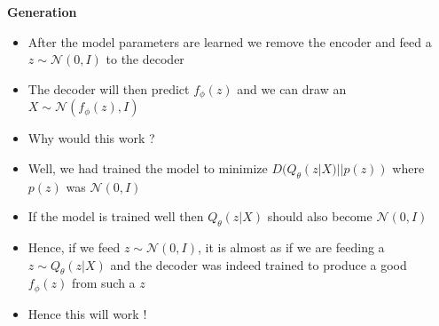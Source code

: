 \begin{frame}
	\begin{columns}
		\begin{overlayarea}{\textwidth}{\textheight}
		\vspace{1cm}
		
		\end{overlayarea}
		\begin{overlayarea}{\textwidth}{\textheight}
			\textbf{Generation}
			\begin{itemize}[<+->]\justifying
				\item After the model parameters are learned we remove the encoder and feed a $z \sim \mathcal{N}(0,I)$ to the decoder
				\item The decoder will then predict $f_\phi(z)$ and we can draw an $X \sim \mathcal{N}(f_\phi(z), I)$
				\item Why would this work ?
				\item Well, we had trained the model to minimize $D(Q_\theta(z|X) || p(z))$ where $p(z)$ was $\mathcal{N}(0,I)$
				\item If the model is trained well then $Q_\theta(z|X)$ should also become $\mathcal{N}(0,I)$
				\item Hence, if we feed $z \sim \mathcal{N}(0,I)$, it is almost as if we are feeding a $z \sim Q_\theta(z|X)$ and the decoder was indeed trained to produce a good $f_\phi(z)$ from such a $z$
				\item Hence this will work !
			\end{itemize}
		\end{overlayarea}
	\end{columns}
\end{frame}
